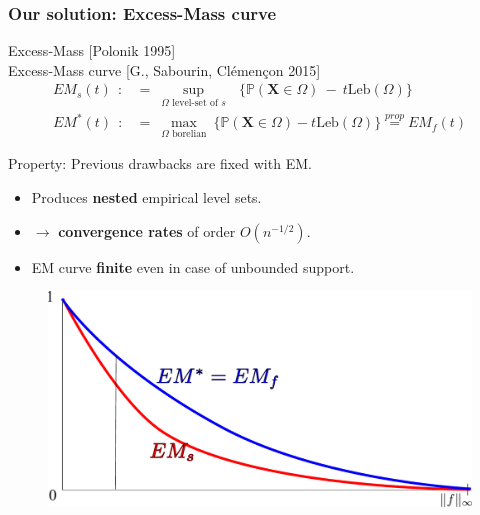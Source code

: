\documentclass[9pt]{beamer}
\newcommand\blue{\color{blue} }
\def\mb{\mathbf}
\def\leb{\text{Leb}}
\begin{document}
\begin{frame}
\frametitle{Our solution: Excess-Mass curve}

Excess-Mass {\small [Polonik 1995]}\\
{\blue \large Excess-Mass curve {\small [G., Sabourin, Clémençon 2015]}}
\begin{align*}
EM_s(t) ~~:&=~ \sup_{\Omega \text{ level-set of } s}~~~\big\{ \mathbb{P}(\mb X \in \Omega) ~-~ t \leb(\Omega) \big\}\\
EM^*(t) ~~:&=~ \max_{\Omega\text{ borelian} } ~\big\{{\mathbb{P}} (\mb X\in \Omega)-t\leb(\Omega) \big\} \overset{prop}{=} EM_f(t)
\end{align*}

\begin{alertblock}{Property: Previous drawbacks are fixed with EM.}
\begin{itemize}
\item Produces \textbf{nested} empirical level sets.
\item $\to$ \textbf{convergence rates} of order $O(n^{-1/2})$.
\item EM curve \textbf{finite} even in case of unbounded support.
\end{itemize}
\end{alertblock}


\begin{figure}
\includegraphics[width = 0.6\linewidth]{sourcefigs/em.pdf}
\end{figure}


\end{frame}


\end{document}
